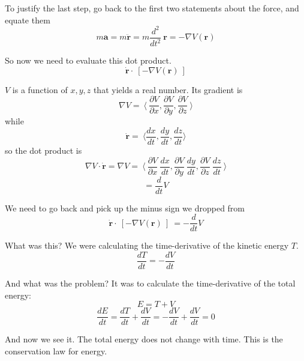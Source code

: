 \documentclass[11pt, oneside]{article}
\begin{document}
To justify the last step, go back to the first two statements about the force, and equate them
\[ m \mathbf{a} = m \mathbf{\ddot{r}} = m \frac{d^2}{dt^2} \ \mathbf{r} =  - \nabla V(\mathbf{r}) \]

So now we need to evaluate this dot product.
\[ \mathbf{\dot{r}} \cdot \ [ - \nabla V(\mathbf{r}) \  ] \]

$V$ is a function of $x,y,z$ that yields a real number.  Its gradient is
\[ \nabla V = \ \langle \ \frac{\partial V}{\partial x},  \frac{\partial V}{\partial y},  \frac{\partial V}{\partial z} \ \rangle \]
while 
\[ \mathbf{\dot{r}} = \ \langle \frac{dx}{dt}, \frac{dy}{dt}, \frac{dz}{dt} \rangle \]
so the dot product is
\[  \nabla V \cdot  \mathbf{\dot{r}}  = \nabla V = \ \langle \ \frac{\partial V}{\partial x} \ \frac{dx}{dt},  \frac{\partial V}{\partial y} \ \frac{dy}{dt},  \frac{\partial V}{\partial z} \ \frac{dz}{dt} \ \rangle \]
\[ = \frac{d}{dt} V \]

We need to go back and pick up the minus sign we dropped from
\[ \mathbf{\dot{r}} \cdot \ [ - \nabla V(\mathbf{r}) \  ]  \ = - \frac{d}{dt} V \]

What was this?  We were calculating the time-derivative of the kinetic energy $T$.
\[ \frac{dT}{dt} = - \frac{dV}{dt} \]

And what was the problem?  It was to calculate the time-derivative of the total energy:
\[ E = T + V \]
\[ \frac{dE}{dt} =  \frac{dT}{dt} +  \frac{dV}{dt} =  -\frac{dV}{dt} +  \frac{dV}{dt} = 0 \]

And now we see it.  The total energy does not change with time.  This is the conservation law for energy.
\end{document}
